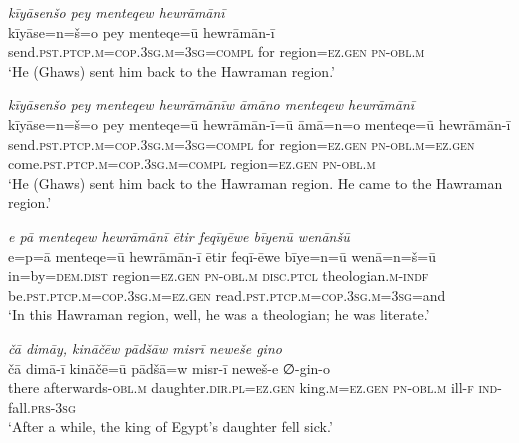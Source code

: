 \ea \label{ZP.20}
\textit{kīyāsenšo pey menteqew hewrāmānī} \\ 
\gll kīyāse=n=š=o pey menteqe=ū hewrāmān-ī \\ 
 send\textsc{.pst}\textsc{.ptcp}\textsc{.m}\textsc{=cop}\textsc{.3sg}\textsc{.m}\textsc{=3sg}\textsc{=compl} for region\textsc{\textsc{=ez.gen}} \textsc{pn}\textsc{-obl}\textsc{.m} \\ 
\glt `He (Ghaws) sent him back to the Hawraman region.'
\z 
 
\ea \label{ZP.21}
\textit{kīyāsenšo pey menteqew hewrāmānīw āmāno menteqew hewrāmānī} \\ 
\gll kīyāse=n=š=o pey menteqe=ū hewrāmān-ī=ū āmā=n=o menteqe=ū hewrāmān-ī \\ 
 send\textsc{.pst}\textsc{.ptcp}\textsc{.m}\textsc{=cop}\textsc{.3sg}\textsc{.m}\textsc{=3sg}\textsc{=compl} for region\textsc{\textsc{=ez.gen}} \textsc{pn}\textsc{-obl}\textsc{.m}\textsc{\textsc{=ez.gen}} come\textsc{.pst}\textsc{.ptcp}\textsc{.m}\textsc{=cop}\textsc{.3sg}\textsc{.m}\textsc{=compl} region\textsc{\textsc{=ez.gen}} \textsc{pn}\textsc{-obl}\textsc{.m} \\ 
\glt `He (Ghaws) sent him back to the Hawraman region. He came to the Hawraman region.'
\z 
 
\ea \label{ZP.23}
\textit{e pā menteqew hewrāmānī ētir feqīyēwe bīyenū wenānšū} \\ 
\gll e=p=ā menteqe=ū hewrāmān-ī ētir feqī-ēwe bīye=n=ū wenā=n=š=ū \\ 
 in=by=\textsc{dem.dist} region\textsc{\textsc{=ez.gen}} \textsc{pn}\textsc{-obl}\textsc{.m} \textsc{disc.ptcl} theologian\textsc{.m}\textsc{-indf} be\textsc{.pst}\textsc{.ptcp}\textsc{.m}\textsc{=cop}\textsc{.3sg}\textsc{.m}\textsc{\textsc{=ez.gen}} read\textsc{.pst}\textsc{.ptcp}\textsc{.m}\textsc{=cop}\textsc{.3sg}\textsc{.m}\textsc{=3sg}=and \\ 
\glt `In this Hawraman region, well, he was a theologian; he was literate.'
\z 
 
\ea \label{ZP.25}
\textit{čā dimāy, kināčēw pādšāw misrī neweše gino} \\ 
\gll čā dimā-ī kināčē=ū pādšā=w misr-ī neweš-e ∅-gin-o \\ 
 there afterwards\textsc{-obl}\textsc{.m} daughter\textsc{.dir}\textsc{.pl}\textsc{\textsc{=ez.gen}} king\textsc{.m}\textsc{\textsc{=ez.gen}} \textsc{pn}\textsc{-obl}\textsc{.m} ill\textsc{-f} \textsc{ind-}fall\textsc{.prs}\textsc{-3sg} \\ 
\glt `After a while, the king of Egypt’s daughter fell sick.'
\z 
 

